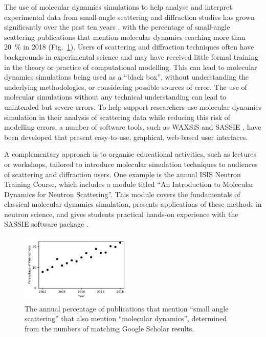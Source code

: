 \documentclass[amsmath,amssymb,twocolumn,superscriptaddress]{revtex4-1}
\begin{document}
\noindent The use of molecular dynamics simulations to help analyse and interpret experimental data from small-angle scattering and diffraction studies has grown significantly over the past ten years \cite{pan_molecular_2012,boldon_review_2015,hub_interpreting_2018,ivanovic_temperature-dependent_2018,east_structural_2016,wall_conformational_2014,wall_internal_2018,satoh_multiple_2015},
with the percentage of small-angle scattering publications that mention molecular dynamics reaching more than \SI{20}{\percent} in 2018 (Fig.~\ref{fig:growth}).
Users of scattering and diffraction techniques often have backgrounds in experimental science and may have received little formal training in the theory or practice of computational modelling.
This can lead to molecular dynamics simulations being used as a ``black box'', without understanding the underlying methodologies, or considering possible sources of error.
The use of molecular simulations without any technical understanding can lead to unintended but severe errors.
To help support researchers use molecular dynamics simulation in their analysis of scattering data while reducing this risk of modelling errors, a number of software tools, such as WAXSiS and SASSIE \cite{chen_validating_2014,knight_waxsis_2015,perkins_atomistic_2016}, have been developed that present easy-to-use, graphical, web-based user interfaces.

A complementary approach is to organise educational activities, such as lectures or workshops, tailored to introduce molecular simulation techniques to audiences of scattering and diffraction users.
One example is the annual ISIS Neutron Training Course, which includes a module titled ``An Introduction to Molecular Dynamics for Neutron Scattering''.
This module covers the fundamentals of classical molecular dynamics simulation, presents applications of these methods in neutron science, and gives students practical hands-on experience with the SASSIE software package \cite{perkins_atomistic_2016}.

%
\begin{figure}
\label{fig:growth}
\includegraphics[width=0.48\textwidth]{figures/chem_data_py.pdf}
\caption{The annual percentage of publications that mention ``small angle scattering'' that also mention ``molecular dynamics'', determined from the numbers of matching Google Scholar results.}
\end{figure}
%
\end{document}
